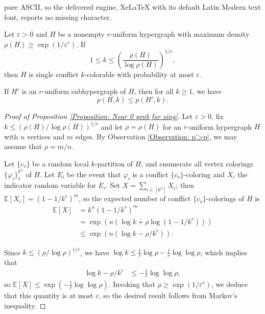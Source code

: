\documentclass[10pt,a4paper]{amsart}
\newcommand{\E}{\mathbb{E}}
\begin{document}
pure ASCII, so the delivered engine, XeLaTeX with its default Latin Modern text font, reports no missing character.
\begin{proposition} 
\label{Proposition: Near 0 prob for sing}
    Let $\varepsilon>0$ and $H$ be a nonempty $r$-uniform hypergraph with maximum density $\rho(H)\geq \exp(1/\varepsilon^r)$. If 
    $$
    1\leq k\leq \left(\frac{\rho(H)}{\log \rho(H)}\right)^{1/r},
    $$ 
    then $H$ is single conflict $k$-colorable with probability at most $\varepsilon$.
\end{proposition}

\begin{observation} 
\label{Observation: p'>p}
    If $H'$ is an $r$-uniform subhypergraph of $H$, then for all $k\geq 1$, we have
    $$
    p(H,k)\leq p(H',k).
    $$ 
\end{observation}

\begin{proof}[Proof of Proposition \ref{Proposition: Near 0 prob for sing}]
    Let $\varepsilon>0$, fix $k\leq (\rho(H)/\log \rho(H))^{1/r}$ and let $\rho=\rho(H)$ for an $r$-uniform hypergraph $H$ with $n$ vertices and $m$ edges. By Observation \ref{Observation: p'>p}, we may assume that $\rho=m/n$.

    Let $\{c_v\}$ be a random local $k$-partition of $H$, and enumerate all vertex colorings $\{\varphi_i\}_1^{k^n}$ of $H$. Let $E_i$ be the event that $\varphi_i$ is a conflict $\{c_v\}$-coloring and $X_i$ the indicator random variable for $E_i$. Set $X=\sum_{i\in [k^n]}X_i $; then
    $\E[X_i] 
    =(1-1/k^r)^m$,
    so the expected number of conflict $\{c_v\}$-colorings of $H$ is
    \begin{align*}
    \E[X] 
	&=k^n(1-1/k^r)^m\\
	&=\exp(n(\log k+\rho \log(1-1/k^r))) \\
    	&\leq \exp(n(\log k-\rho/k^r)).
    \end{align*}
    
    Since $k\leq (\rho/\log \rho)^{1/r}$, we have %
	$\log k \leq \frac{1}{r}\log \rho-\frac{1}{r}\log \log \rho$, which implies that
    \begin{align*}
    \log k - \rho/k^r 
    &\leq -\frac{1}{r}\log \log \rho,
    \end{align*}
    so
    $\E[X] 
    \leq \exp\left(-\frac{1}{r}\log \log \rho\right)$.
    Invoking that $\rho\geq \exp(1/\varepsilon^r)$, we deduce
	that this quantity is at most $\varepsilon$, so the desired result follows
	from Markov's inequality.
\end{proof}
\end{document}
